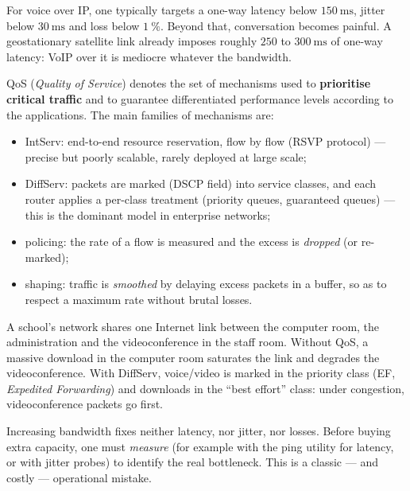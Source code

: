 \documentclass[11pt]{article}
\newcommand{\cle}[1]{{\popxbold\color{popdark}#1}}
\begin{document}
\begin{exemplebox}
For voice over IP, one typically targets a one-way latency below $150\ \mathrm{ms}$, jitter below $30\ \mathrm{ms}$ and loss below $1\ \%$. Beyond that, conversation becomes painful. A geostationary satellite link already imposes roughly $250$ to $300\ \mathrm{ms}$ of one-way latency: VoIP over it is mediocre whatever the bandwidth.
\end{exemplebox}

\begin{definition}
\cle{QoS} (\emph{Quality of Service}) denotes the set of mechanisms used to \textbf{prioritise critical traffic} and to guarantee differentiated performance levels according to the applications. The main families of mechanisms are:
\begin{itemize}
\item \cle{IntServ}: end-to-end resource reservation, flow by flow (RSVP protocol) --- precise but poorly scalable, rarely deployed at large scale;
\item \cle{DiffServ}: packets are marked (DSCP field) into service classes, and each router applies a per-class treatment (priority queues, guaranteed queues) --- this is the dominant model in enterprise networks;
\item \cle{policing}: the rate of a flow is measured and the excess is \emph{dropped} (or re-marked);
\item \cle{shaping}: traffic is \emph{smoothed} by delaying excess packets in a buffer, so as to respect a maximum rate without brutal losses.
\end{itemize}
\end{definition}

\begin{exemplebox}
A school's network shares one Internet link between the computer room, the administration and the videoconference in the staff room. Without QoS, a massive download in the computer room saturates the link and degrades the videoconference. With DiffServ, voice/video is marked in the priority class (EF, \emph{Expedited Forwarding}) and downloads in the ``best effort'' class: under congestion, videoconference packets go first.
\end{exemplebox}

\begin{attention}
Increasing bandwidth fixes neither latency, nor jitter, nor losses. Before buying extra capacity, one must \emph{measure} (for example with the ping utility for latency, or with jitter probes) to identify the real bottleneck. This is a classic --- and costly --- operational mistake.
\end{attention}
\end{document}
